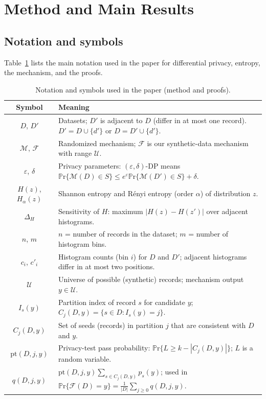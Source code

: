 \documentclass[journal,transmag]{IEEEtran}
\begin{document}
\section{Method and Main Results}

\subsection{Notation and symbols}
Table~\ref{tab:notation} lists the main notation used in the paper for differential privacy, entropy, the mechanism, and the proofs.
\begin{table}[t]
\centering
\caption{Notation and symbols used in the paper (method and proofs).}
\label{tab:notation}
\begin{tabular}{cl}
\hline
\textbf{Symbol} & \textbf{Meaning} \\
\hline
$D$, $D'$ & Datasets; $D'$ is adjacent to $D$ (differ in at most one record). $D' = D \cup \{d'\}$ or $D = D' \cup \{d'\}$. \\
$\mathcal{M}$, $\mathcal{F}$ & Randomized mechanism; $\mathcal{F}$ is our synthetic-data mechanism with range $\mathcal{U}$. \\
$\varepsilon$, $\delta$ & Privacy parameters: $(\varepsilon,\delta)$-DP means $\mathbb{P}\mathrm{r}\{\mathcal{M}(D)\in S\} \leq e^\varepsilon \mathbb{P}\mathrm{r}\{\mathcal{M}(D')\in S\} + \delta$. \\
$H(z)$, $H_\alpha(z)$ & Shannon entropy and R\'enyi entropy (order $\alpha$) of distribution $z$. \\
$\Delta_H$ & Sensitivity of $H$: maximum $|H(z)-H(z')|$ over adjacent histograms. \\
$n$, $m$ & $n$ = number of records in the dataset; $m$ = number of histogram bins. \\
$c_i$, $c'_i$ & Histogram counts (bin $i$) for $D$ and $D'$; adjacent histograms differ in at most two positions. \\
$\mathcal{U}$ & Universe of possible (synthetic) records; mechanism output $y \in \mathcal{U}$. \\
$I_s(y)$ & Partition index of record $s$ for candidate $y$; $C_j(D,y) = \{s \in D : I_s(y) = j\}$. \\
$C_j(D,y)$ & Set of seeds (records) in partition $j$ that are consistent with $D$ and $y$. \\
$\mathrm{pt}(D,j,y)$ & Privacy-test pass probability: $\mathbb{P}\mathrm{r}\{L \geq k - |C_j(D,y)|\}$; $L$ is a random variable. \\
$q(D,j,y)$ & $\mathrm{pt}(D,j,y) \sum_{s \in C_j(D,y)} p_s(y)$; used in $\mathbb{P}\mathrm{r}\{\mathcal{F}(D)=y\} = \frac{1}{|D|}\sum_{j \geq 0} q(D,j,y)$. \\

\end{tabular}
\end{table}
\end{document}
